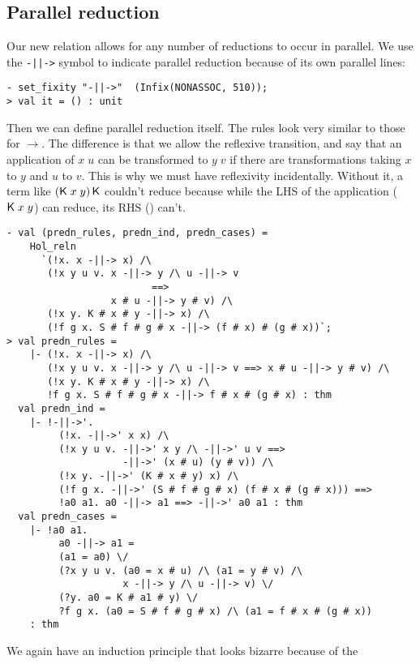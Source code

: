 \subsection{Parallel reduction}
\label{sec:Parallel-Reduction}

Our new relation allows for any number of reductions to occur in
parallel.  We use the \texttt{-||->} symbol to indicate parallel
reduction because of its own parallel lines:
\begin{session}
\begin{verbatim}
- set_fixity "-||->"  (Infix(NONASSOC, 510));
> val it = () : unit
\end{verbatim}
\end{session}
    Then we can define parallel reduction itself.  The rules look very
    similar to those for $\rightarrow$.  The difference is that we
    allow the reflexive transition, and say that an application of
    $x\;u$ can be transformed to $y\;v$ if there are transformations
    taking $x$ to $y$ and $u$ to $v$.  This is why we must have
    reflexivity incidentally.  Without it, a term like
    $({\sf K}\;x\;y)\,{\sf K}$ couldn't reduce because while the LHS of the
    application (${\sf K}\;x\;y$) can reduce, its RHS (\KC) can't.
\begin{session}
\begin{verbatim}
- val (predn_rules, predn_ind, predn_cases) =
    Hol_reln
      `(!x. x -||-> x) /\
       (!x y u v. x -||-> y /\ u -||-> v
                         ==>
                  x # u -||-> y # v) /\
       (!x y. K # x # y -||-> x) /\
       (!f g x. S # f # g # x -||-> (f # x) # (g # x))`;
> val predn_rules =
    |- (!x. x -||-> x) /\
       (!x y u v. x -||-> y /\ u -||-> v ==> x # u -||-> y # v) /\
       (!x y. K # x # y -||-> x) /\
       !f g x. S # f # g # x -||-> f # x # (g # x) : thm
  val predn_ind =
    |- !-||->'.
         (!x. -||->' x x) /\
         (!x y u v. -||->' x y /\ -||->' u v ==>
                    -||->' (x # u) (y # v)) /\
         (!x y. -||->' (K # x # y) x) /\
         (!f g x. -||->' (S # f # g # x) (f # x # (g # x))) ==>
         !a0 a1. a0 -||-> a1 ==> -||->' a0 a1 : thm
  val predn_cases =
    |- !a0 a1.
         a0 -||-> a1 =
         (a1 = a0) \/
         (?x y u v. (a0 = x # u) /\ (a1 = y # v) /\
                    x -||-> y /\ u -||-> v) \/
         (?y. a0 = K # a1 # y) \/
         ?f g x. (a0 = S # f # g # x) /\ (a1 = f # x # (g # x))
    : thm
\end{verbatim}
\end{session}
We again have an induction principle that looks bizarre because of the
